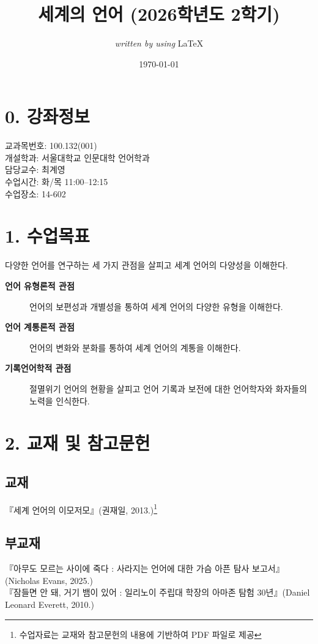 \documentclass{article}
\begin{document}
\title{세계의 언어 (2026학년도 2학기)}
\author{\textit{written by using} \LaTeX}
\date{\today}
\maketitle
\thispagestyle{fancy}
\setcounter{secnumdepth}{0}
\bigskip

\section{0. 강좌정보}
\medskip
교과목번호: 100.132(001)\\
개설학과: 서울대학교 인문대학 언어학과\\
담당교수: 최계영\\
수업시간: 화/목 11:00--12:15\\
수업장소: 14-602

\section{1. 수업목표}
\medskip
다양한 언어를 연구하는 세 가지 관점을 살피고 세계 언어의 다양성을 이해한다.
\medskip
\begin{description}
    \item[\textbf{언어 유형론적 관점}] 언어의 보편성과 개별성을 통하여 세계 언어의 다양한 유형을 이해한다.
    \item[\textbf{언어 계통론적 관점}] 언어의 변화와 분화를 통하여 세계 언어의 계통을 이해한다.
    \item[\textbf{기록언어학적 관점}] 절멸위기 언어의 현황을 살피고 언어 기록과 보전에 대한 언어학자와 화자들의 노력을 인식한다.
\end{description}

\section{2. 교재 및 참고문헌}
\medskip
\subsection{교재}
『세계 언어의 이모저모』(권재일, 2013.)\footnote{수업자료는 교재와 참고문헌의 내용에 기반하여 PDF 파일로 제공}
\subsection{부교재}
『아무도 모르는 사이에 죽다 : 사라지는 언어에 대한 가슴 아픈 탐사 보고서』(Nicholas Evans, 2025.) \\
『잠들면 안 돼, 거기 뱀이 있어 : 일리노이 주립대 학장의 아마존 탐험 30년』(Daniel Leonard Everett, 2010.)
\end{document}

